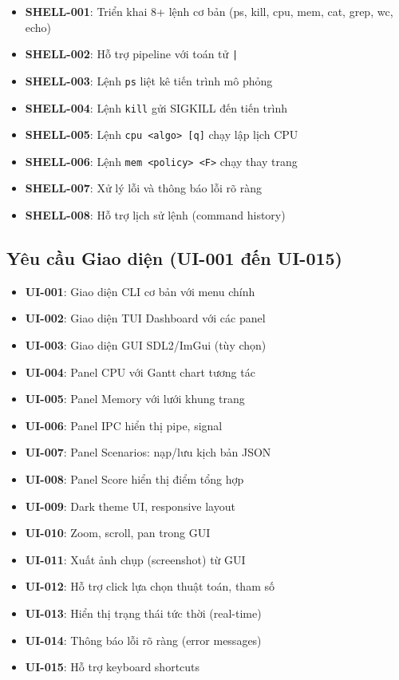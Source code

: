 \begin{itemize}[leftmargin=1.5cm]
  \item \textbf{SHELL-001}: Triển khai 8+ lệnh cơ bản (ps, kill, cpu, mem, cat, grep, wc, echo)
  \item \textbf{SHELL-002}: Hỗ trợ pipeline với toán tử \verb+|+
  \item \textbf{SHELL-003}: Lệnh \verb|ps| liệt kê tiến trình mô phỏng
  \item \textbf{SHELL-004}: Lệnh \verb|kill| gửi SIGKILL đến tiến trình
  \item \textbf{SHELL-005}: Lệnh \verb|cpu <algo> [q]| chạy lập lịch CPU
  \item \textbf{SHELL-006}: Lệnh \verb|mem <policy> <F>| chạy thay trang
  \item \textbf{SHELL-007}: Xử lý lỗi và thông báo lỗi rõ ràng
  \item \textbf{SHELL-008}: Hỗ trợ lịch sử lệnh (command history)
\end{itemize}

\subsection{Yêu cầu Giao diện (UI-001 đến UI-015)}

\begin{itemize}[leftmargin=1.5cm]
  \item \textbf{UI-001}: Giao diện CLI cơ bản với menu chính
  \item \textbf{UI-002}: Giao diện TUI Dashboard với các panel
  \item \textbf{UI-003}: Giao diện GUI SDL2/ImGui (tùy chọn)
  \item \textbf{UI-004}: Panel CPU với Gantt chart tương tác
  \item \textbf{UI-005}: Panel Memory với lưới khung trang
  \item \textbf{UI-006}: Panel IPC hiển thị pipe, signal
  \item \textbf{UI-007}: Panel Scenarios: nạp/lưu kịch bản JSON
  \item \textbf{UI-008}: Panel Score hiển thị điểm tổng hợp
  \item \textbf{UI-009}: Dark theme UI, responsive layout
  \item \textbf{UI-010}: Zoom, scroll, pan trong GUI
  \item \textbf{UI-011}: Xuất ảnh chụp (screenshot) từ GUI
  \item \textbf{UI-012}: Hỗ trợ click lựa chọn thuật toán, tham số
  \item \textbf{UI-013}: Hiển thị trạng thái tức thời (real-time)
  \item \textbf{UI-014}: Thông báo lỗi rõ ràng (error messages)
  \item \textbf{UI-015}: Hỗ trợ keyboard shortcuts
\end{itemize}

